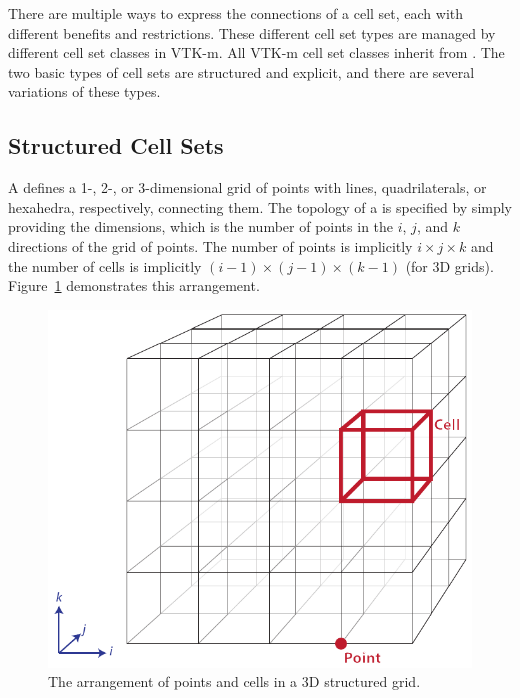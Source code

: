 There are multiple ways to express the connections of a cell set, each with
different benefits and restrictions. These different cell set types are
managed by different cell set classes in VTK-m. All VTK-m cell set classes
inherit from . The two basic types of cell sets are
structured and explicit, and there are several variations of these types.

\subsection{Structured Cell Sets}


A  defines a 1-, 2-, or 3-dimensional grid of
points with lines, quadrilaterals, or hexahedra, respectively, connecting
them. The topology of a  is specified by
simply providing the dimensions, which is the number of points in the $i$,
$j$, and $k$ directions of the grid of points. The number of points is
implicitly $i \times j \times k$ and the number of cells is implicitly
$(i-1) \times (j-1) \times (k-1)$ (for 3D grids).
Figure~\ref{fig:CellSetStructured} demonstrates this arrangement.

\begin{figure}[htb]
  \centering
  \includegraphics{images/StructuredCellSet}
  \caption{The arrangement of points and cells in a 3D structured grid.}
  \label{fig:CellSetStructured}
\end{figure}

